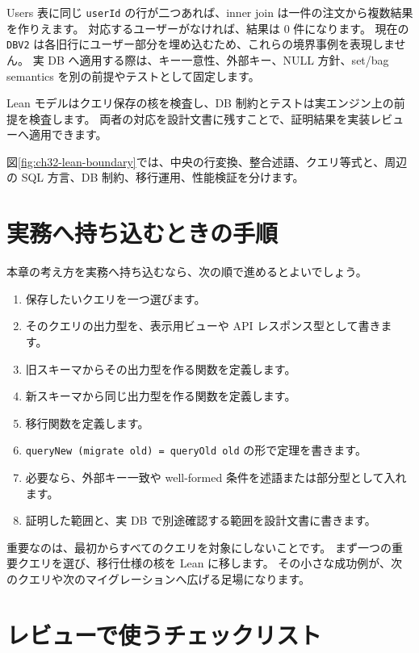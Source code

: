 Users 表に同じ \texttt{userId} の行が二つあれば、inner join は一件の注文から複数結果を作りえます。
対応するユーザーがなければ、結果は 0 件になります。
現在の \texttt{DBV2} は各旧行にユーザー部分を埋め込むため、これらの境界事例を表現しません。
実 DB へ適用する際は、キー一意性、外部キー、NULL 方針、set/bag semantics を別の前提やテストとして固定します。

Lean モデルはクエリ保存の核を検査し、DB 制約とテストは実エンジン上の前提を検査します。
両者の対応を設計文書に残すことで、証明結果を実装レビューへ適用できます。

図\ref{fig:ch32-lean-boundary}では、中央の行変換、整合述語、クエリ等式と、周辺の SQL 方言、DB 制約、移行運用、性能検証を分けます。


\section{実務へ持ち込むときの手順}

本章の考え方を実務へ持ち込むなら、次の順で進めるとよいでしょう。

\begin{enumerate}
\item 保存したいクエリを一つ選びます。
\item そのクエリの出力型を、表示用ビューや API レスポンス型として書きます。
\item 旧スキーマからその出力型を作る関数を定義します。
\item 新スキーマから同じ出力型を作る関数を定義します。
\item 移行関数を定義します。
\item \texttt{queryNew (migrate old) = queryOld old} の形で定理を書きます。
\item 必要なら、外部キー一致や well-formed 条件を述語または部分型として入れます。
\item 証明した範囲と、実 DB で別途確認する範囲を設計文書に書きます。
\end{enumerate}

重要なのは、最初からすべてのクエリを対象にしないことです。
まず一つの重要クエリを選び、移行仕様の核を Lean に移します。
その小さな成功例が、次のクエリや次のマイグレーションへ広げる足場になります。

\section{レビューで使うチェックリスト}

